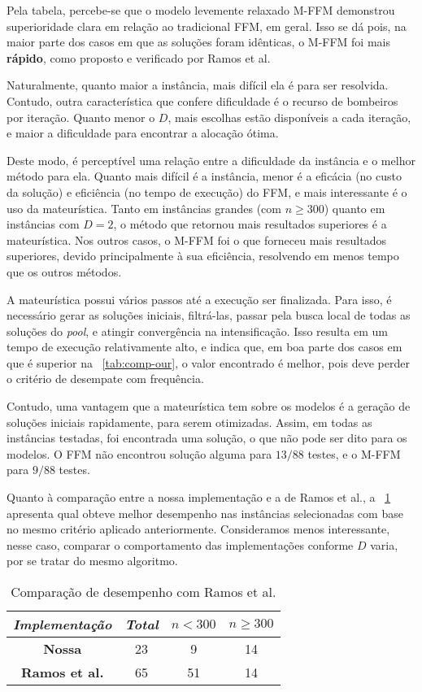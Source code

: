 \documentclass{MO824}
\begin{document}
Pela tabela, percebe-se que o modelo levemente relaxado M-FFM demonstrou superioridade clara em relação ao tradicional FFM, em geral. Isso se dá pois, na maior parte dos casos em que as soluções foram idênticas, o M-FFM foi mais \textbf{rápido}, como proposto e verificado por Ramos et al.

Naturalmente, quanto maior a instância, mais difícil ela é para ser resolvida. Contudo, outra característica que confere dificuldade é o recurso de bombeiros por iteração. Quanto menor o $D$, mais escolhas estão disponíveis a cada iteração, e maior a dificuldade para encontrar a alocação ótima.

Deste modo, é perceptível uma relação entre a dificuldade da instância e o melhor método para ela. Quanto mais difícil é a instância, menor é a eficácia (no custo da solução) e eficiência (no tempo de execução) do FFM, e mais interessante é o uso da mateurística. Tanto em instâncias grandes (com $n \geq 300$) quanto em instâncias com $D=2$, o método que retornou mais resultados superiores é a mateurística. Nos outros casos, o M-FFM foi o que forneceu mais resultados superiores, devido principalmente à sua eficiência, resolvendo em menos tempo que os outros métodos. 

A mateurística possui vários passos até a execução ser finalizada. Para isso, é necessário gerar as soluções iniciais, filtrá-las, passar pela busca local de todas as soluções do \textit{pool}, e atingir convergência na intensificação. Isso resulta em um tempo de execução relativamente alto, e indica que, em boa parte dos casos em que é superior na \tablename~\ref{tab:comp-our}, o valor encontrado é melhor, pois deve perder o critério de desempate com frequência.

Contudo, uma vantagem que a mateurística tem sobre os modelos é a geração de soluções iniciais rapidamente, para serem otimizadas. Assim, em todas as instâncias testadas, foi encontrada uma solução, o que não pode ser dito para os modelos. O FFM não encontrou solução alguma para $13/88$ testes, e o M-FFM para $9/88$ testes. 

Quanto à comparação entre a nossa implementação e a de Ramos et al., a \tablename~\ref{tab:comp-nat} apresenta qual obteve melhor desempenho nas instâncias selecionadas com base no mesmo critério aplicado anteriormente. Consideramos menos interessante, nesse caso, comparar o comportamento das implementações conforme $D$ varia, por se tratar do mesmo algoritmo. 

\begin{table}[ht]
    \centering
    \begin{tabular}{|c|c|c|c|}
        \hline
         \textit{Implementação} & \textit{Total} & $n < 300$ & $n \geq 300$  \\
         \hline
         \textbf{Nossa} & 23 & 9 & 14\\
         \textbf{Ramos et al.} & 65 & 51 & 14 \\
         \hline
    \end{tabular}
    \caption{Comparação de desempenho com Ramos et al.}
    \label{tab:comp-nat}
\end{table}
\end{document}
